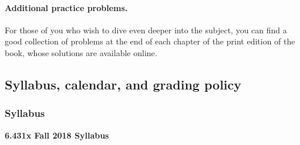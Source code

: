 \documentclass[pdftex, brazil, 12pt, twoside]{article}
\begin{document}
\paragraph{Additional practice problems.} For those of you who wish to dive even
deeper into the subject, you can find a good collection of problems at the end of
each chapter of the print edition of the book, whose solutions are available online. 


\subsection{Syllabus, calendar, and grading policy}
\label{ovw0-sy}

\subsubsection{Syllabus}
\label{ovw0-sy-sy}

\textbf{6.431x Fall 2018 Syllabus}
\end{document}
